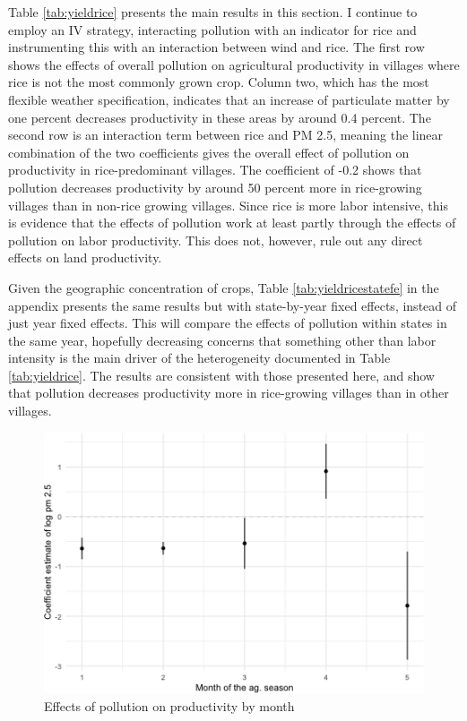 \documentclass[
]{article}
\begin{document}
Table \ref{tab:yieldrice} presents the main results in this section. I continue to employ an IV strategy, interacting pollution with an indicator for rice and instrumenting this with an interaction between wind and rice. The first row shows the effects of overall pollution on agricultural productivity in villages where rice is not the most commonly grown crop. Column two, which has the most flexible weather specification, indicates that an increase of particulate matter by one percent decreases productivity in these areas by around 0.4 percent. The second row is an interaction term between rice and PM 2.5, meaning the linear combination of the two coefficients gives the overall effect of pollution on productivity in rice-predominant villages. The coefficient of -0.2 shows that pollution decreases productivity by around 50 percent more in rice-growing villages than in non-rice growing villages. Since rice is more labor intensive, this is evidence that the effects of pollution work at least partly through the effects of pollution on labor productivity. This does not, however, rule out any direct effects on land productivity.

Given the geographic concentration of crops, Table \ref{tab:yieldricestatefe} in the appendix presents the same results but with state-by-year fixed effects, instead of just year fixed effects. This will compare the effects of pollution within states in the same year, hopefully decreasing concerns that something other than labor intensity is the main driver of the heterogeneity documented in Table \ref{tab:yieldrice}. The results are consistent with those presented here, and show that pollution decreases productivity more in rice-growing villages than in other villages.

\begin{figure}
\includegraphics{draft_files/figure-latex/yield8monthly-1} \caption[Effects of pollution on productivity by month]{Effects of pollution on productivity by month}\label{fig:yield8monthly}
\end{figure}
\end{document}
